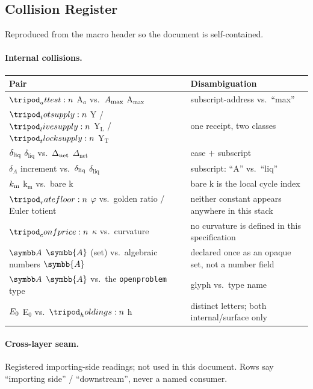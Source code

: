 \documentclass[../main.tex]{subfiles}
\begin{document}
\subsection{Collision Register}
\label{sec:symbols:collisions}

Reproduced from the macro header so the document is self-contained.

\paragraph{Internal collisions.}
\begin{center}
\begin{tabular}{@{}l l@{}}
    \toprule
    \textbf{Pair} & \textbf{Disambiguation} \\
    \midrule
    $\attest{}$ A$_a$ vs.\ $A\sb{\max}$ A$_{\max}$ & subscript-address vs.\ ``max'' \\
    $\totsupply{}$ Y / $\livesupply{}$ Y$_{\mathrm{L}}$ / $\tlocksupply{}$ Y$_{\mathrm{T}}$ & one receipt, two classes \\
    $\delta\sb{\mathrm{liq}}$ $\delta_{\mathrm{liq}}$ vs.\ $\Delta\sb{\mathrm{net}}$ $\Delta_{\mathrm{net}}$ & case $+$ subscript \\
    $\delta_A$ increment vs.\ $\delta\sb{\mathrm{liq}}$ $\delta_{\mathrm{liq}}$ & subscript: ``A'' vs.\ ``liq'' \\
    $k\sb{\mathrm{m}}$ k$_{\mathrm{m}}$ vs.\ bare k & bare k is the local cycle index \\
    $\ratefloor{}$ $\varphi$ vs.\ golden ratio / Euler totient & neither constant appears anywhere in this stack \\
    $\confprice{}$ $\kappa$ vs.\ curvature & no curvature is defined in this specification \\
    $\addrspace$ $\symbb{A}$ (set) vs.\ algebraic numbers $\symbb{A}$ & declared once as an opaque set, not a number field \\
    $\addrspace$ $\symbb{A}$ vs.\ the \texttt{openproblem} type & glyph vs.\ type name \\
    $E\sb{0}$ E$_0$ vs.\ $\holdings{}$ h & distinct letters; both internal/surface only \\
    \bottomrule
\end{tabular}
\end{center}

\paragraph{Cross-layer seam.}
Registered importing-side readings; not used in this document. Rows say ``importing side''
/ ``downstream'', never a named consumer.
\end{document}
